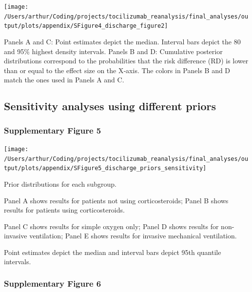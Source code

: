 \documentclass[
]{article}
\begin{document}
\begin{center}\texttt{[image: /Users/arthur/Coding/projects/tocilizumab\_reanalysis/final\_analyses/output/plots/appendix/SFigure4\_discharge\_figure2]} \end{center}

Panels A and C: Point estimates depict the median. Interval bars depict
the 80 and 95\% highest density intervals. Panels B and D: Cumulative
posterior distributions correspond to the probabilities that the risk
difference (RD) is lower than or equal to the effect size on the X‐axis.
The colors in Panels B and D match the ones used in Panels A and C.

\newpage

\hypertarget{sensitivity-analyses-using-different-priors-1}{%
\subsection{Sensitivity analyses using different
priors}\label{sensitivity-analyses-using-different-priors-1}}

\hypertarget{supplementary-figure-5}{%
\subsubsection{Supplementary Figure 5}\label{supplementary-figure-5}}

\begin{center}\texttt{[image: /Users/arthur/Coding/projects/tocilizumab\_reanalysis/final\_analyses/output/plots/appendix/SFigure5\_discharge\_priors\_sensitivity]} \end{center}

Prior distributions for each subgroup.

Panel A shows results for patients not using corticosteroids; Panel B
shows results for patients using corticosteroids.

Panel C shows results for simple oxygen only; Panel D shows results for
non-invasive ventilation; Panel E shows results for invasive mechanical
ventilation.

Point estimates depict the median and interval bars depict 95th quantile
intervals.

\newpage

\hypertarget{supplementary-figure-6}{%
\subsubsection{Supplementary Figure 6}\label{supplementary-figure-6}}
\end{document}
